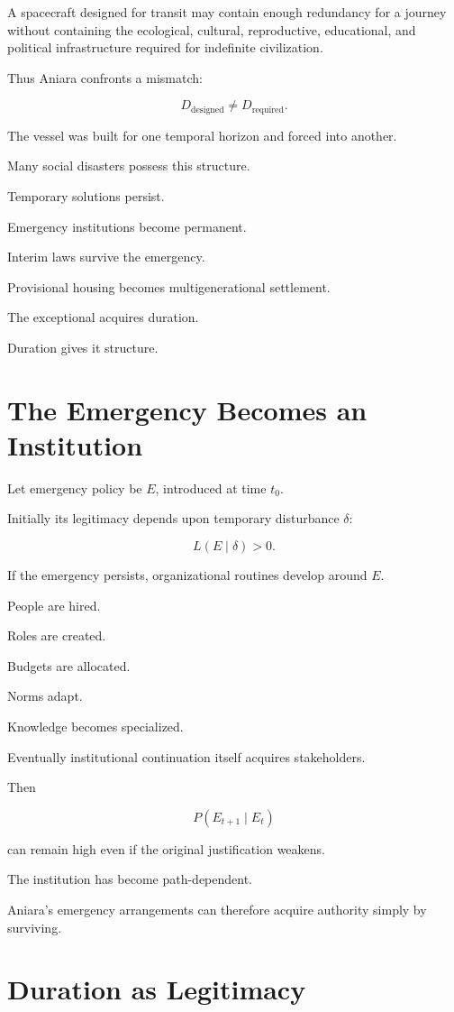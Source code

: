 \documentclass[11pt,oneside]{book}
\theoremstyle{definition}
\theoremstyle{remark}
\begin{document}
A spacecraft designed for transit may contain enough redundancy for a journey without containing the ecological, cultural, reproductive, educational, and political infrastructure required for indefinite civilization.

Thus Aniara confronts a mismatch:

\[
D_{\mathrm{designed}}
\neq
D_{\mathrm{required}}.
\]

The vessel was built for one temporal horizon and forced into another.

Many social disasters possess this structure.

Temporary solutions persist.

Emergency institutions become permanent.

Interim laws survive the emergency.

Provisional housing becomes multigenerational settlement.

The exceptional acquires duration.

Duration gives it structure.

\section{The Emergency Becomes an Institution}

Let emergency policy be \(E\), introduced at time \(t_0\).

Initially its legitimacy depends upon temporary disturbance \(\delta\):

\[
L(E\mid\delta)>0.
\]

If the emergency persists, organizational routines develop around \(E\).

People are hired.

Roles are created.

Budgets are allocated.

Norms adapt.

Knowledge becomes specialized.

Eventually institutional continuation itself acquires stakeholders.

Then

\[
P(E_{t+1}\mid E_t)
\]

can remain high even if the original justification weakens.

The institution has become path-dependent.

Aniara's emergency arrangements can therefore acquire authority simply by surviving.

\section{Duration as Legitimacy}
\end{document}
